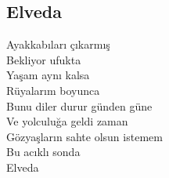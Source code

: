 \subsection{Elveda}

Ayakkabıları çıkarmış \\
Bekliyor ufukta \\
Yaşam aynı kalsa \\
Rüyalarım boyunca \\
Bunu diler durur günden güne \\
Ve yolculuğa geldi zaman \\
Gözyaşların sahte olsun istemem \\
Bu acıklı sonda \\
Elveda